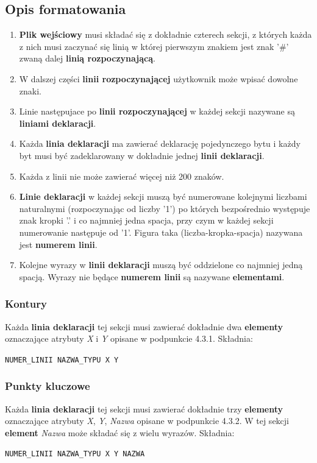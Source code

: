 \documentclass[a4paper, 10pt, titlepage]{article}
\newcommand{\code}[1]{\texttt{#1}}
\begin{document}
\subsection{Opis formatowania}
\begin{enumerate}

\item \textbf{Plik wejściowy} musi składać się z dokładnie czterech sekcji, z których każda z nich musi zaczynać się linią w której pierwszym znakiem jest znak '\#' zwaną dalej \textbf{linią rozpoczynającą}.
\item W dalszej części \textbf{linii rozpoczynającej} użytkownik może wpisać dowolne znaki. 
\item Linie następujace po \textbf{linii rozpoczynającej} w każdej sekcji nazywane są \textbf{liniami deklaracji}.
\item Każda \textbf{linia deklaracji} ma zawierać deklarację pojedynczego bytu i każdy byt musi być zadeklarowany w dokładnie jednej \textbf{linii deklaracji}.
\item Każda z linii nie może zawierać więcej niż 200 znaków.
\item \textbf{Linie deklaracji} w każdej sekcji muszą być numerowane kolejnymi liczbami naturalnymi (rozpoczynając od liczby '1') po których bezpośrednio występuje znak kropki '.' i co najmniej jedna spacja, przy czym w każdej sekcji numerowanie następuje od '1'. Figura taka (liczba-kropka-spacja) nazywana jest \textbf{numerem linii}.
\item Kolejne wyrazy w \textbf{linii deklaracji} muszą być oddzielone co najmniej jedną spacją. Wyrazy nie będące \textbf{numerem linii} są nazywane \textbf{elementami}.
\end{enumerate}

\subsubsection{Kontury}
Każda \textbf{linia deklaracji} tej sekcji musi zawierać dokładnie dwa \textbf{elementy} oznaczające atrybuty \textit{X} i \textit{Y} opisane w podpunkcie 4.3.1. Składnia:
\begin{center}
\code{NUMER\_LINII NAZWA\_TYPU X Y}
\end{center}
\subsubsection{Punkty kluczowe}
Każda \textbf{linia deklaracji} tej sekcji musi zawierać dokładnie trzy \textbf{elementy} oznaczające atrybuty \textit{X}, \textit{Y}, \textit{Nazwa} opisane w podpunkcie 4.3.2. W tej sekcji \textbf{element} \textit{Nazwa} może składać się z wielu wyrazów. Składnia:
\begin{center}
\code{NUMER\_LINII NAZWA\_TYPU X Y NAZWA}
\end{center}
\end{document}
